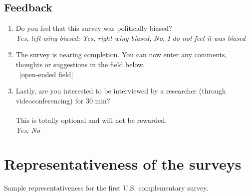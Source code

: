 \subsection*{Feedback}
\begin{enumerate}[resume]
\item Do you feel that this survey was politically biased?
\\ \textit{Yes, left-wing biased; Yes, right-wing biased; No, I do not feel it was biased}
\item The survey is nearing completion. You can now enter any comments, thoughts or suggestions in the field below.
\\ ~[open-ended field]
\item Lastly, are you interested to be interviewed by a researcher (through videoconferencing) for 30 min? \\
\\
This is totally optional and will not be rewarded.
\\ \textit{Yes; No}
\end{enumerate}

\clearpage
\section{Representativeness of the surveys}\label{app:representativeness}

\begin{table}[h]\label{tab:representativeness_US1}
    \caption{Sample representativeness for the first U.S. complementary survey.} 
    \makebox[\textwidth][c]{
        \resizebox{.95\textwidth}{!}{%
        
        }
    }
\end{table}